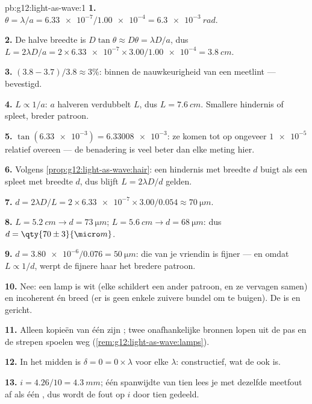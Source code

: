 \begin{solution}{pb:g12:light-as-wave:1}
\textbf{1.} $\theta = \lambda/a = \num{6.33e-7}/\num{1.00e-4} =
\qty{6.3e-3}{rad}$.

\textbf{2.} De halve breedte is $D\tan\theta \approx D\theta = \lambda
D/a$, dus $L = 2\lambda D/a = 2 \times \num{6.33e-7} \times
3.00/\num{1.00e-4} = \qty{3.8}{cm}$.

\textbf{3.} $(3.8 - 3.7)/3.8 \approx 3\%$: binnen de nauwkeurigheid van
een meetlint --- bevestigd.

\textbf{4.} $L \propto 1/a$: $a$ halveren verdubbelt $L$, dus
$L = \qty{7.6}{cm}$. Smallere hindernis of spleet, breder patroon.

\textbf{5.} $\tan(\num{6.33e-3}) = \num{6.33008e-3}$: ze komen tot op
ongeveer $\num{1e-5}$ relatief overeen --- de benadering is veel beter
dan elke meting hier.

\textbf{6.} Volgens \cref{prop:g12:light-as-wave:hair}: een hindernis met
breedte $d$ buigt als een spleet met breedte $d$, dus blijft
$L = 2\lambda D/d$ gelden.

\textbf{7.} $d = 2\lambda D/L = 2 \times \num{6.33e-7} \times
3.00/0.054 \approx \qty{70}{\micro m}$.

\textbf{8.} $L = \qty{5.2}{cm} \to d = \qty{73}{\micro m}$;
$L = \qty{5.6}{cm} \to d = \qty{68}{\micro m}$: dus
$d = \qty{70 \pm 3}{\micro m}$.

\textbf{9.} $d = \num{3.80e-6}/0.076 = \qty{50}{\micro m}$: die van je
vriendin is fijner --- en omdat $L \propto 1/d$, werpt de fijnere haar het
bredere patroon.

\textbf{10.} Nee: een lamp is wit (elke  schildert een ander
patroon, en ze vervagen samen) en incoherent én breed (er is geen enkele
zuivere bundel om te buigen). De  is  en gericht.

\textbf{11.} Alleen kopieën van één  zijn ; twee
onafhankelijke bronnen lopen uit de pas en de strepen spoelen weg
(\cref{rem:g12:light-as-wave:lamps}).

\textbf{12.} In het midden is $\delta = 0 = 0 \times \lambda$ voor elke
$\lambda$: constructief, wat de  ook is.

\textbf{13.} $i = 4.26/10 = \qty{4.3}{mm}$; één spanwijdte van tien lees
je met dezelfde meetfout af als één , dus wordt de fout op
$i$ door tien gedeeld.


\end{solution}
